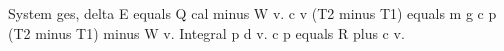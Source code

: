 System ges, delta E equals Q cal minus W v. c v (T2 minus T1) equals m g c p (T2 minus T1) minus W v. Integral p d v. c p equals R plus c v.